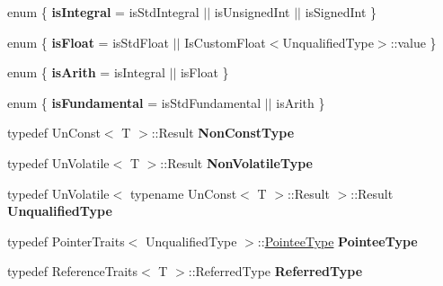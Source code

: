 \begin{DoxyCompactItemize}
\item 
\hypertarget{classLoki_1_1TypeTraits_a622c18c8a4eee89a29bf8fdbace8f499}{}enum \{ {\bfseries is\+Integral} = is\+Std\+Integral $\vert$$\vert$ is\+Unsigned\+Int $\vert$$\vert$ is\+Signed\+Int
 \}\label{classLoki_1_1TypeTraits_a622c18c8a4eee89a29bf8fdbace8f499}

\item 
\hypertarget{classLoki_1_1TypeTraits_a9c315e1a3040970d62dce73bc9698022}{}enum \{ {\bfseries is\+Float} = is\+Std\+Float $\vert$$\vert$ Is\+Custom\+Float$<$Unqualified\+Type$>$\+:\+:value
 \}\label{classLoki_1_1TypeTraits_a9c315e1a3040970d62dce73bc9698022}

\item 
\hypertarget{classLoki_1_1TypeTraits_a428ec5c2970b79366afedd79576280fd}{}enum \{ {\bfseries is\+Arith} = is\+Integral $\vert$$\vert$ is\+Float
 \}\label{classLoki_1_1TypeTraits_a428ec5c2970b79366afedd79576280fd}

\item 
\hypertarget{classLoki_1_1TypeTraits_a6f40b5a4b8ac6f57195241b6fd175fa6}{}enum \{ {\bfseries is\+Fundamental} = is\+Std\+Fundamental $\vert$$\vert$ is\+Arith
 \}\label{classLoki_1_1TypeTraits_a6f40b5a4b8ac6f57195241b6fd175fa6}

\item 
\hypertarget{classLoki_1_1TypeTraits_ad249cd5af1b44aaffa03b64ef3159379}{}typedef Un\+Const$<$ T $>$\+::Result {\bfseries Non\+Const\+Type}\label{classLoki_1_1TypeTraits_ad249cd5af1b44aaffa03b64ef3159379}

\item 
\hypertarget{classLoki_1_1TypeTraits_a9f2171e886c8f6c9a048dc71b2c4cb45}{}typedef Un\+Volatile$<$ T $>$\+::Result {\bfseries Non\+Volatile\+Type}\label{classLoki_1_1TypeTraits_a9f2171e886c8f6c9a048dc71b2c4cb45}

\item 
\hypertarget{classLoki_1_1TypeTraits_ab4a0da265760a5ca751f965eb3f2429b}{}typedef Un\+Volatile$<$ typename Un\+Const$<$ T $>$\+::Result $>$\+::Result {\bfseries Unqualified\+Type}\label{classLoki_1_1TypeTraits_ab4a0da265760a5ca751f965eb3f2429b}

\item 
\hypertarget{classLoki_1_1TypeTraits_aefb4a0c695c324c399c5d48be57a9ea7}{}typedef Pointer\+Traits$<$ Unqualified\+Type $>$\+::\hyperlink{classLoki_1_1NullType}{Pointee\+Type} {\bfseries Pointee\+Type}\label{classLoki_1_1TypeTraits_aefb4a0c695c324c399c5d48be57a9ea7}

\item 
\hypertarget{classLoki_1_1TypeTraits_ab1701f60e9aef13d81b6106d3c2bd541}{}typedef Reference\+Traits$<$ T $>$\+::Referred\+Type {\bfseries Referred\+Type}\label{classLoki_1_1TypeTraits_ab1701f60e9aef13d81b6106d3c2bd541}


\end{DoxyCompactItemize}
